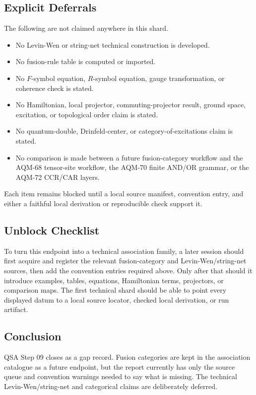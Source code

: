\subsection{Explicit Deferrals}

The following are not claimed anywhere in this shard.

\begin{itemize}
\item No Levin-Wen or string-net technical construction is developed.
\item No fusion-rule table is computed or imported.
\item No \(F\)-symbol equation, \(R\)-symbol equation, gauge transformation,
or coherence check is stated.
\item No Hamiltonian, local projector, commuting-projector result, ground
space, excitation, or topological order claim is stated.
\item No quantum-double, Drinfeld-center, or category-of-excitations claim is
stated.
\item No comparison is made between a future fusion-category workflow and the
AQM-68 tensor-site workflow, the AQM-70 finite AND/OR grammar, or the AQM-72
CCR/CAR layers.
\end{itemize}

Each item remains blocked until a local source manifest, convention entry, and
either a faithful local derivation or reproducible check support it.

\subsection{Unblock Checklist}

To turn this endpoint into a technical association family, a later session
should first acquire and register the relevant fusion-category and
Levin-Wen/string-net sources, then add the convention entries required above.
Only after that should it introduce examples, tables, equations, Hamiltonian
terms, projectors, or comparison maps.  The first technical shard should be
able to point every displayed datum to a local source locator, checked local
derivation, or run artifact.

\subsection{Conclusion}

QSA Step 09 closes as a gap record.  Fusion categories are kept in the
association catalogue as a future endpoint, but the report currently has only
the source queue and convention warnings needed to say what is missing.  The
technical Levin-Wen/string-net and categorical claims are deliberately
deferred.

